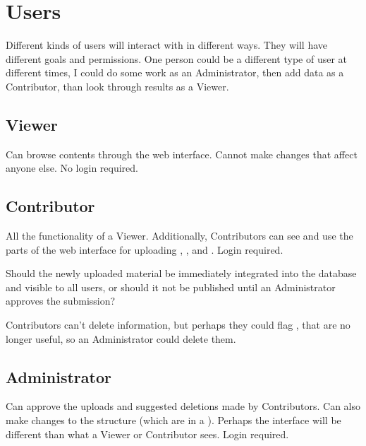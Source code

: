 \section{Users}

Different kinds of users will interact with \phycomb in different ways.
They will have different goals and permissions.
One person could be a different type of user at different times, \eg I could do some work as an Administrator, then add data as a Contributor, than look through results as a Viewer.

\subsection{Viewer}

Can browse \phycomb contents through the web interface.
Cannot make changes that affect anyone else.
No login required.

\subsection{Contributor}

All the functionality of a Viewer.
Additionally, Contributors can see and use the parts of the web interface for uploading \Elements, \Methods, and \Performance.
Login required.

Should the newly uploaded material be immediately integrated into the database and visible to all users, or should it not be published until an Administrator approves the submission?

Contributors can't delete information, but perhaps they could flag \Elements, \etc that are no longer useful, so an Administrator could delete them.

\subsection{Administrator}

Can approve the uploads and suggested deletions made by Contributors.
Can also make changes to the structure (\eg which \Elements are in a \Benchmark).
Perhaps the interface will be different than what a Viewer or Contributor sees.
Login required.
